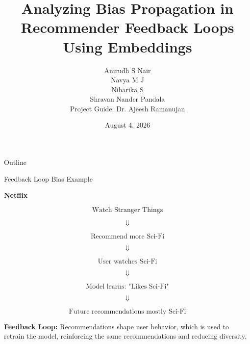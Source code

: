 \documentclass[11pt,aspectratio=43]{beamer}
\title[Bias Propagation in Recommender Loops]{Analyzing Bias Propagation in Recommender Feedback Loops Using Embeddings}
\author[Group 12]{%
  Anirudh S Nair \\
  Navya M J \\
  Niharika S \\
  Shravan Nander Pandala \\[1.5ex]
  Project Guide: Dr. Ajeesh Ramanujan%
}
\institute[College of Engineering Trivandrum]{%
  Department of Computer Science and Engineering\\
  College of Engineering Trivandrum}
\date{August 4, 2026}
\begin{document}
\begin{frame}
  \titlepage
\end{frame}

\begin{frame}{Outline}
  \tableofcontents
\end{frame}

\begin{frame}{Feedback Loop Bias Example}
\scriptsize

\textbf{Netflix}

\[
\text{Watch Stranger Things}
\]

\vspace{-0.2cm}
\[
\Downarrow
\]

\vspace{-0.2cm}
\[
\text{Recommend more Sci-Fi}
\]

\vspace{-0.2cm}
\[
\Downarrow
\]

\vspace{-0.2cm}
\[
\text{User watches Sci-Fi}
\]

\vspace{-0.2cm}
\[
\Downarrow
\]

\vspace{-0.2cm}
\[
\text{Model learns: "Likes Sci-Fi"}
\]

\vspace{-0.2cm}
\[
\Downarrow
\]

\vspace{-0.2cm}
\[
\text{Future recommendations mostly Sci-Fi}
\]

\vspace{0.15cm}

\textbf{Feedback Loop:}
Recommendations shape user behavior, which is used to retrain the model, reinforcing the same recommendations and reducing diversity.

\end{frame}

\end{document}
